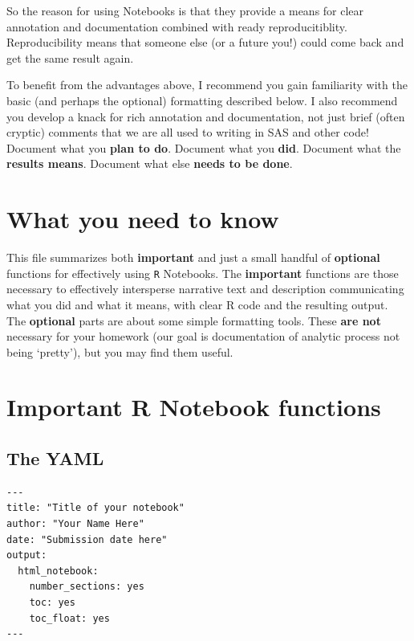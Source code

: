 \documentclass[
]{book}
\newcommand{\passthrough}[1]{#1}
\begin{document}
So the reason for using Notebooks is that they provide a means for clear annotation and documentation combined with ready reproducitiblity. Reproducibility means that someone else (or a future you!) could come back and get the same result again.

To benefit from the advantages above, I recommend you gain familiarity with the basic (and perhaps the optional) formatting described below. I also recommend you develop a knack for rich annotation and documentation, not just brief (often cryptic) comments that we are all used to writing in SAS and other code! Document what you \textbf{plan to do}. Document what you \textbf{did}. Document what the \textbf{results means}. Document what else \textbf{needs to be done}.

\hypertarget{what-you-need-to-know}{%
\section*{What you need to know}\label{what-you-need-to-know}}

This file summarizes both \textbf{important} and just a small handful of \textbf{optional} functions for effectively using \passthrough{\lstinline!R!} Notebooks. The \textbf{important} functions are those necessary to effectively intersperse narrative text and description communicating what you did and what it means, with clear R code and the resulting output. The \textbf{optional} parts are about some simple formatting tools. These \textbf{are not} necessary for your homework (our goal is documentation of analytic process not being `pretty'), but you may find them useful.

\hypertarget{important-r-notebook-functions}{%
\section*{Important R Notebook functions}\label{important-r-notebook-functions}}

\hypertarget{the-yaml}{%
\subsection*{The YAML}\label{the-yaml}}

\begin{lstlisting}
---
title: "Title of your notebook"
author: "Your Name Here"
date: "Submission date here"
output:
  html_notebook:
    number_sections: yes
    toc: yes
    toc_float: yes
---
\end{lstlisting}
\end{document}
